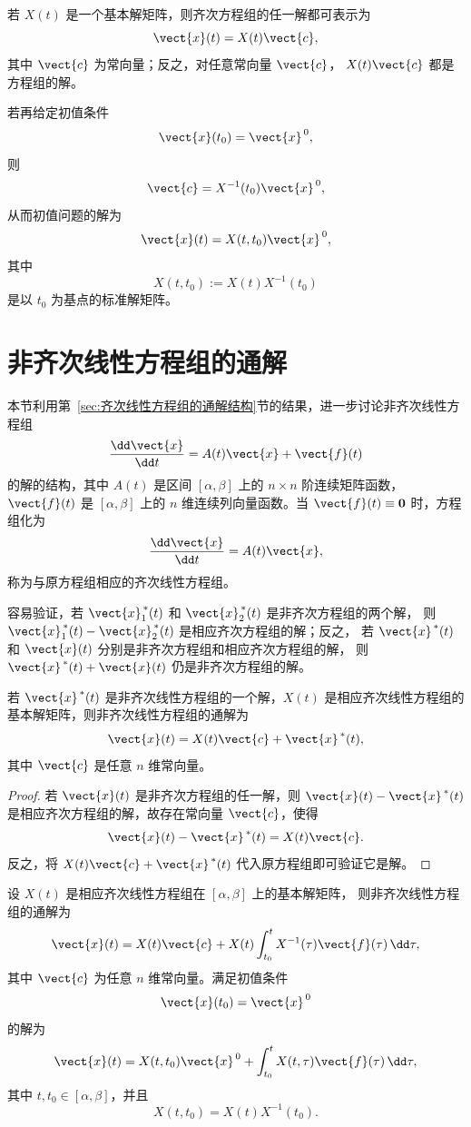 若 $X(t)$ 是一个基本解矩阵，则齐次方程组的任一解都可表示为
\[
	\vect{x}(t)=X(t)\vect{c},
\]
其中 $\vect{c}$ 为常向量；反之，对任意常向量 $\vect{c}$，
$X(t)\vect{c}$ 都是方程组的解。

若再给定初值条件
\[
	\vect{x}(t_0)=\vect{x}^{\,0},
\]
则
\[
	\vect{c}=X^{-1}(t_0)\vect{x}^{\,0},
\]
从而初值问题的解为
\[
	\vect{x}(t)=X(t,t_0)\vect{x}^{\,0},
\]
其中
\[
	X(t,t_0):=X(t)X^{-1}(t_0)
\]
是以 $t_0$ 为基点的标准解矩阵。

\section{非齐次线性方程组的通解}\label{sec:非齐次线性方程组的通解}

本节利用第~\ref{sec:齐次线性方程组的通解结构}节的结果，进一步讨论非齐次线性方程组
\[
	\dfrac{\dd\vect{x}}{\dd t}=A(t)\vect{x}+\vect{f}(t)
\]
的解的结构，其中 $A(t)$ 是区间 $[\alpha,\beta]$ 上的 $n\times n$ 阶连续矩阵函数，
$\vect{f}(t)$ 是 $[\alpha,\beta]$ 上的 $n$ 维连续列向量函数。当
$\vect{f}(t)\equiv\boldsymbol{0}$ 时，方程组化为
\[
	\dfrac{\dd\vect{x}}{\dd t}=A(t)\vect{x},
\]
称为与原方程组相应的齐次线性方程组。

容易验证，若 $\vect{x}_1^{\,*}(t)$ 和 $\vect{x}_2^{\,*}(t)$ 是非齐次方程组的两个解，
则 $\vect{x}_1^{\,*}(t)-\vect{x}_2^{\,*}(t)$ 是相应齐次方程组的解；反之，
若 $\vect{x}^{\,*}(t)$ 和 $\vect{x}(t)$ 分别是非齐次方程组和相应齐次方程组的解，
则 $\vect{x}^{\,*}(t)+\vect{x}(t)$ 仍是非齐次方程组的解。

\begin{theorem}\label{thm:非齐次线性方程组的通解结构}
	若 $\vect{x}^{\,*}(t)$ 是非齐次线性方程组的一个解，$X(t)$ 是相应齐次线性方程组的
	基本解矩阵，则非齐次线性方程组的通解为
	\[
		\vect{x}(t)=X(t)\vect{c}+\vect{x}^{\,*}(t),
	\]
	其中 $\vect{c}$ 是任意 $n$ 维常向量。
\end{theorem}

\begin{proof}
	若 $\vect{x}(t)$ 是非齐次方程组的任一解，则
	$\vect{x}(t)-\vect{x}^{\,*}(t)$ 是相应齐次方程组的解，故存在常向量
	$\vect{c}$，使得
	\[
		\vect{x}(t)-\vect{x}^{\,*}(t)=X(t)\vect{c}.
	\]
	反之，将 $X(t)\vect{c}+\vect{x}^{\,*}(t)$ 代入原方程组即可验证它是解。
\end{proof}

\begin{theorem}\label{thm:常数变易公式}
	设 $X(t)$ 是相应齐次线性方程组在 $[\alpha,\beta]$ 上的基本解矩阵，
	则非齐次线性方程组的通解为
	\[
		\vect{x}(t)
		=X(t)\vect{c}
		+X(t)\int_{t_0}^{t}X^{-1}(\tau)\vect{f}(\tau)\,\dd\tau,
	\]
	其中 $\vect{c}$ 为任意 $n$ 维常向量。满足初值条件
	\[
		\vect{x}(t_0)=\vect{x}^{\,0}
	\]
	的解为
	\[
		\vect{x}(t)
		=X(t,t_0)\vect{x}^{\,0}
		+\int_{t_0}^{t}X(t,\tau)\vect{f}(\tau)\,\dd\tau,
	\]
	其中 $t,t_0\in[\alpha,\beta]$，并且
	\[
		X(t,t_0)=X(t)X^{-1}(t_0).
	\]
\end{theorem}

